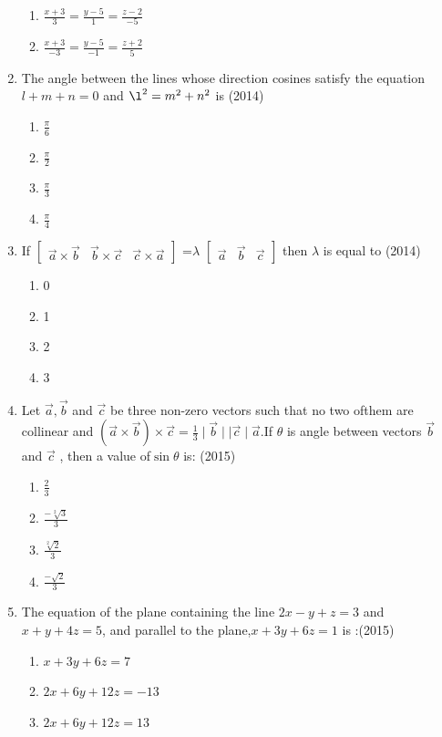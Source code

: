 \documentclass[12pt]{article}
\providecommand{\brak}[1]{\ensuremath{\left(#1\right)}}
\begin{document}
\begin{enumerate}
\begin{enumerate}
\item $\frac{x+3}{3}=\frac{y-5}{1}=\frac{z-2}{-5}$
\item $\frac{x+3}{-3}=\frac{y-5}{-1}=\frac{z+2}{5}$
\end{enumerate}
\item The angle between the lines whose direction cosines satisfy the equation $l+m+n=0$ and $\l^2=m^2+n^2$ is (2014)
\begin{enumerate}
\item $\frac{\pi}{6}$
\item $\frac{\pi}{2}$
\item $\frac{\pi}{3}$
\item $\frac{\pi}{4}$
\end{enumerate}
\item If 
$
\begin{bmatrix}
 \vec{a}\times\vec{b} &\vec{b}\times \vec{c} & \vec{c}\times\vec{a}
\end{bmatrix}$
=$\lambda$
$
\begin{bmatrix}
\vec{a} & \vec{b} & \vec{c}
\end{bmatrix}
$
then $\lambda$ is equal to (2014)
\begin{enumerate}
\item 0
\item 1
\item 2
\item 3 
\end{enumerate}
\item Let $\vec{a},\vec{b}$ and $\vec{c}$ be three non-zero vectors such that no two ofthem are collinear and $\brak{\vec{a}\times\vec{b}}\times \vec{c}=\frac{1}{3}\mid \vec{b} \mid \mid \vec{c} \mid \vec{a}$.If $\theta$ is angle between vectors $\vec{b}$ and $\vec{c}$ , then a value of$\sin \theta$ is: (2015)
\begin{enumerate}
\item $\frac{2}{3}$
\item $\frac{-\sqrt[2]{3}}{3}$
\item $\frac{\sqrt[2]{2}}{3}$
\item $\frac{-\sqrt{2}}{3}$
\end{enumerate}
\item The equation of the plane containing the line $2x-y+z=3$ and $x+y+4z=5$, and parallel to the plane,$x+3y+6z=1$ is :(2015)
\begin{enumerate}
\item $x+3y+6z=7$
\item $2x+6y+12z=-13$
\item $2x+6y+12z=13$

\end{enumerate}
\end{enumerate}
\end{document}
